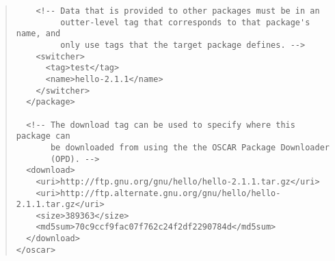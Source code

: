 \begin{quote}
\begin{small}
\begin{verbatim}
    <!-- Data that is provided to other packages must be in an
         outter-level tag that corresponds to that package's name, and
         only use tags that the target package defines. -->
    <switcher>
      <tag>test</tag>
      <name>hello-2.1.1</name>
    </switcher>
  </package>

  <!-- The download tag can be used to specify where this package can
       be downloaded from using the the OSCAR Package Downloader
       (OPD). -->
  <download>
    <uri>http://ftp.gnu.org/gnu/hello/hello-2.1.1.tar.gz</uri>
    <uri>http://ftp.alternate.gnu.org/gnu/hello/hello-2.1.1.tar.gz</uri>
    <size>389363</size>
    <md5sum>70c9ccf9fac07f762c24f2df2290784d</md5sum>
  </download>
</oscar>
\end{verbatim}
\end{small}
\end{quote}

